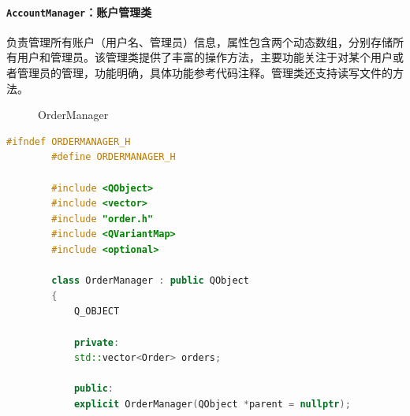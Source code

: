 \documentclass{article}
\begin{document}
	\paragraph{\texttt{AccountManager}：账户管理类} 负责管理所有账户（用户名、管理员）信息，属性包含两个动态数组，分别存储所有用户和管理员。该管理类提供了丰富的操作方法，主要功能关注于对某个用户或者管理员的管理，功能明确，具体功能参考代码注释。管理类还支持读写文件的方法。
	
	\begin{figure}[H]
		\centering
		
		\caption{OrderManager}
		\label{OrderManager}
	\end{figure}
	
	\begin{lstlisting}[language=C++, caption={OrderManager}]
		#ifndef ORDERMANAGER_H
		#define ORDERMANAGER_H
		
		#include <QObject>
		#include <vector>
		#include "order.h"
		#include <QVariantMap>
		#include <optional>
		
		class OrderManager : public QObject
		{
			Q_OBJECT
			
			private:
			std::vector<Order> orders;
			
			public:
			explicit OrderManager(QObject *parent = nullptr);
			

\end{lstlisting}
\end{document}
